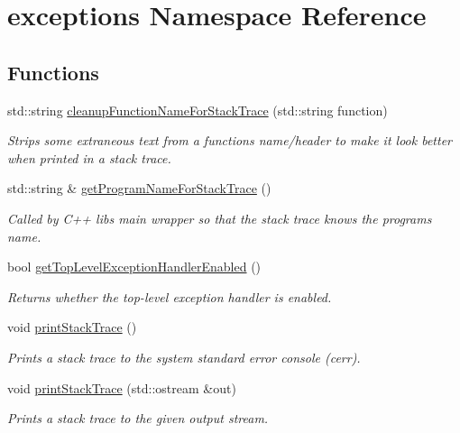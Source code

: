 \hypertarget{namespaceexceptions}{}\section{exceptions Namespace Reference}
\label{namespaceexceptions}
\subsection*{Functions}
\begin{DoxyCompactItemize}
\item 
std\+::string \mbox{\hyperlink{namespaceexceptions_a5461ca18351950c6bfd41a5848e5cc21}{cleanup\+Function\+Name\+For\+Stack\+Trace}} (std\+::string function)
\begin{DoxyCompactList}\small\item\em Strips some extraneous text from a function\textquotesingle{}s name/header to make it look better when printed in a stack trace. \end{DoxyCompactList}\item 
std\+::string \& \mbox{\hyperlink{namespaceexceptions_ad0ad190a25caba8c9ce8b2083205cd63}{get\+Program\+Name\+For\+Stack\+Trace}} ()
\begin{DoxyCompactList}\small\item\em Called by C++ lib\textquotesingle{}s main wrapper so that the stack trace knows the program\textquotesingle{}s name. \end{DoxyCompactList}\item 
bool \mbox{\hyperlink{namespaceexceptions_a6a3658a12893a1ea2acaa6fc6e8b6d82}{get\+Top\+Level\+Exception\+Handler\+Enabled}} ()
\begin{DoxyCompactList}\small\item\em Returns whether the top-\/level exception handler is enabled. \end{DoxyCompactList}\item 
void \mbox{\hyperlink{namespaceexceptions_aead48c8fee26adf26f493d0856d73830}{print\+Stack\+Trace}} ()
\begin{DoxyCompactList}\small\item\em Prints a stack trace to the system standard error console (cerr). \end{DoxyCompactList}\item 
void \mbox{\hyperlink{namespaceexceptions_af5ab86e2f23863043ddcdaf18b8b9f28}{print\+Stack\+Trace}} (std\+::ostream \&out)
\begin{DoxyCompactList}\small\item\em Prints a stack trace to the given output stream. \end{DoxyCompactList}\item 

\end{DoxyCompactItemize}
